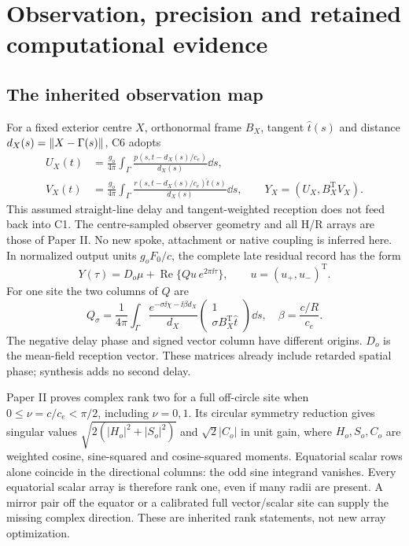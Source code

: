 \section{Observation, precision and retained computational evidence}\label{sec:observations}
\subsection{The inherited observation map}
For a fixed exterior centre $X$, orthonormal frame $B_X$, tangent $\hat t(s)$ and distance $d_X(s)=\lVert X-\Gamma(s)\rVert$, C6 adopts
\begin{equation}\label{eq:C6}
 \begin{aligned}
 U_X(t)&=\frac{g_o}{4\pi}\int_\Gamma\frac{p(s,t-d_X(s)/c_e)}{d_X(s)}\dd s,\\
 V_X(t)&=\frac{g_o}{4\pi}\int_\Gamma\frac{r(s,t-d_X(s)/c_e)\hat t(s)}{d_X(s)}\dd s,
 \qquad Y_X=(U_X,B_X^{\mathrm T}V_X).
 \end{aligned}
\end{equation}
This assumed straight-line delay and tangent-weighted reception does not feed back into C1. The centre-sampled observer geometry and all H/R arrays are those of Paper II. No new spoke, attachment or native coupling is inferred here. In normalized output units $g_oF_0/c$, the complete late residual record has the form
\begin{equation}\label{eq:record}
 Y(\tau)=D_o\mu+\operatorname{Re}\{Q u\,e^{2\pi\ii\tau}\},\qquad u=(u_+,u_-)^{\mathrm T}.
\end{equation}
For one site the two columns of $Q$ are
\[
 Q_\sigma=\frac1{4\pi}\int_\Gamma
 \frac{e^{-\sigma\ii\chi-\ii\beta d_X}}{d_X}
 \begin{pmatrix}1\\\sigma B_X^{\mathrm T}\hat t\end{pmatrix}\dd s,
 \quad \beta=\frac{c/R}{c_e}.
\]
The negative delay phase and signed vector column have different origins. $D_o$ is the mean-field reception vector. These matrices already include retarded spatial phase; synthesis adds no second delay.

Paper II proves complex rank two for a full off-circle site when $0\le\nu=c/c_e<\pi/2$, including $\nu=0,1$. Its circular symmetry reduction gives singular values $\sqrt{2(|H_o|^2+|S_o|^2)}$ and $\sqrt2|C_o|$ in unit gain, where $H_o,S_o,C_o$ are weighted cosine, sine-squared and cosine-squared moments. Equatorial scalar rows alone coincide in the directional columns: the odd sine integrand vanishes. Every equatorial scalar array is therefore rank one, even if many radii are present. A mirror pair off the equator or a calibrated full vector/scalar site can supply the missing complex direction. These are inherited rank statements, not new array optimization.

